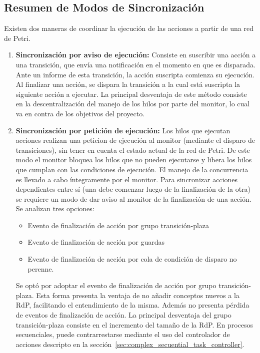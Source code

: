 \subsection{Resumen de Modos de Sincronización}
\label{sec:resumen_sincronizacion}
Existen dos maneras de coordinar la ejecución de las acciones a partir de una
red de Petri.\\ 
\begin{enumerate}
  \item \textbf{Sincronización por aviso de ejecución: } Consiste en suscribir
  una acción a una transición, que envía una notificación en el momento en que
  es disparada. Ante un informe de esta transición, la acción suscripta
  comienza su ejecución.
  Al finalizar una acción, se dispara la transición a la cual está suscripta la
  siguiente acción a ejecutar.
  La principal desventaja de este método consiste en la descentralización del
  manejo de los hilos por parte del monitor, lo cual va en contra de los objetivos del
  proyecto.
  \item \textbf{Sincronización por petición de ejecución: } Los hilos que
  ejecutan acciones realizan una peticion de ejecución al monitor (mediante el
  disparo de transiciones), sin tener en cuenta el estado actual de la red de
  Petri. De este modo el monitor bloquea los hilos que no pueden ejecutarse y
  libera los hilos que cumplan con las condiciones de ejecución. El manejo de
  la concurrencia es llevado a cabo íntegramente por el monitor.
  Para sincronizar acciones dependientes entre sí (una debe comenzar luego de
  la finalización de la otra) se requiere un modo de dar aviso al monitor de
  la finalización de una acción. Se analizan tres opciones:
  \begin{itemize}
      \item Evento de finalización de acción por grupo transición-plaza
	  \item Evento de finalización de acción por guardas
	  \item Evento de finalización de acción por cola de condición de disparo no
	  perenne.
  \end{itemize}
  Se optó por adoptar el evento de finalización de acción por grupo
  transición-plaza. Esta forma presenta la ventaja de no añadir
  conceptos nuevos a la RdP, facilitando el entendimiento de la misma. Además
  no presenta pérdida de eventos de finalización de acción.
  La principal desventaja del grupo transición-plaza consiste en el incremento
  del tamaño de la RdP. En procesos secuenciales, puede contrarrestarse mediante
  el uso del controlador de acciones descripto en la
  sección~\ref{sec:complex_secuential_task_controller}.
\end{enumerate}
 

 
 
 
 
